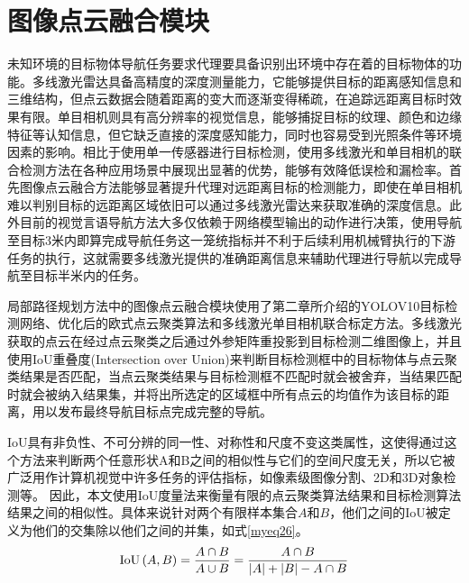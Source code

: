 \section{图像点云融合模块}
未知环境的目标物体导航任务要求代理要具备识别出环境中存在着的目标物体的功能。多线激光雷达具备高精度的深度测量能力，它能够提供目标的距离感知信息和三维结构，但点云数据会随着距离的变大而逐渐变得稀疏，在追踪远距离目标时效果有限。单目相机则具有高分辨率的视觉信息，能够捕捉目标的纹理、颜色和边缘特征等认知信息，但它缺乏直接的深度感知能力，同时也容易受到光照条件等环境因素的影响。相比于使用单一传感器进行目标检测，使用多线激光和单目相机的联合检测方法在各种应用场景中展现出显著的优势，能够有效降低误检和漏检率。首先图像点云融合方法能够显著提升代理对远距离目标的检测能力，即使在单目相机难以判别目标的远距离区域依旧可以通过多线激光雷达来获取准确的深度信息。此外目前的视觉言语导航方法大多仅依赖于网络模型输出的动作进行决策，使用导航至目标3米内即算完成导航任务这一笼统指标并不利于后续利用机械臂执行的下游任务的执行，这就需要多线激光提供的准确距离信息来辅助代理进行导航以完成导航至目标半米内的任务。

局部路径规划方法中的图像点云融合模块使用了第二章所介绍的YOLOV10目标检测网络、优化后的欧式点云聚类算法和多线激光单目相机联合标定方法。多线激光获取的点云在经过点云聚类之后通过外参矩阵重投影到目标检测二维图像上，并且使用IoU重叠度(Intersection over Union)来判断目标检测框中的目标物体与点云聚类结果是否匹配，当点云聚类结果与目标检测框不匹配时就会被舍弃，当结果匹配时就会被纳入结果集，并将出所选定的区域框中所有点云的均值作为该目标的距离，用以发布最终导航目标点完成完整的导航。

IoU具有非负性、不可分辨的同一性、对称性和尺度不变这类属性，这使得通过这个方法来判断两个任意形状A和B之间的相似性与它们的空间尺度无关，所以它被广泛用作计算机视觉中许多任务的评估指标，如像素级图像分割、2D和3D对象检测等。
因此，本文使用IoU度量法来衡量有限的点云聚类算法结果和目标检测算法结果之间的相似性。具体来说针对两个有限样本集合$A$和$B$，他们之间的IoU被定义为他们的交集除以他们之间的并集，如式\ref{myeq26}。
\begin{equation}
    {\rm{IoU}}\left( {A,B} \right) = \frac{{A \cap B}}{{A \cup B}} = \frac{{A \cap B}}{{\left| A \right| + \left| B \right| - A \cap B}}
    \label{myeq26}
\end{equation}

